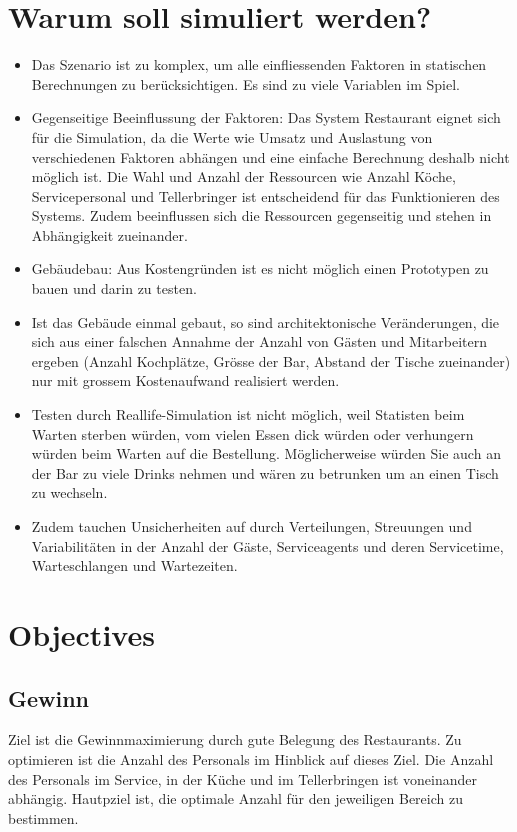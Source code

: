 \documentclass[ngerman,a4paper,12pt]{scrreprt}
\begin{document}
\section{Warum soll simuliert werden?}
	\begin{itemize}
		\item Das Szenario ist zu komplex, um alle einfliessenden Faktoren in statischen Berechnungen zu berücksichtigen. Es sind zu  viele Variablen im Spiel.
		\item Gegenseitige Beeinflussung der Faktoren: Das System Restaurant eignet sich für die Simulation, da die Werte wie Umsatz und Auslastung von verschiedenen Faktoren abhängen und eine einfache Berechnung deshalb nicht möglich ist. Die Wahl und Anzahl der Ressourcen wie Anzahl Köche, Servicepersonal und Tellerbringer ist entscheidend für das Funktionieren des Systems. Zudem beeinflussen sich die Ressourcen gegenseitig und stehen in Abhängigkeit zueinander.
		\item Gebäudebau: Aus Kostengründen ist es nicht möglich einen Prototypen zu bauen und darin zu testen.
		\item Ist das Gebäude einmal gebaut, so sind  architektonische Veränderungen, die sich aus einer falschen Annahme der Anzahl von Gästen und Mitarbeitern ergeben (Anzahl Kochplätze, Grösse der Bar, Abstand der Tische zueinander) nur mit grossem Kostenaufwand realisiert werden.
		\item Testen durch Reallife-Simulation ist nicht möglich, weil Statisten beim Warten sterben würden, vom vielen Essen dick würden oder verhungern würden beim Warten auf die Bestellung. Möglicherweise würden Sie auch an der Bar zu viele Drinks nehmen und wären zu betrunken um an einen Tisch zu wechseln.
		\item Zudem tauchen Unsicherheiten auf durch Verteilungen,  Streuungen und Variabilitäten in der Anzahl der Gäste, Serviceagents und deren Servicetime, Warteschlangen und Wartezeiten.
	\end{itemize}

\section{Objectives}
	\subsection{Gewinn}
	Ziel ist die Gewinnmaximierung durch gute Belegung des Restaurants. Zu optimieren ist die Anzahl des Personals im Hinblick auf dieses Ziel. Die Anzahl des Personals im Service, in der Küche und im Tellerbringen ist voneinander abhängig. Hautpziel ist, die optimale Anzahl für den jeweiligen Bereich zu bestimmen. 
\end{document}

